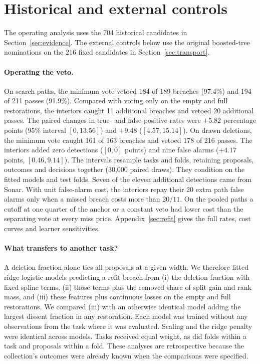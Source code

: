 \section{Historical and external controls}
\label{sec:extended-operating}
The operating analysis uses the 704 historical candidates in Section~\ref{sec:evidence}. The external controls below use the original boosted-tree nominations on the 216 fixed candidates in Section~\ref{sec:transport}.

\paragraph{Operating the veto.}
On search paths, the minimum vote vetoed 184 of 189 breaches (97.4\%) and 194 of 211 passes (91.9\%). Compared with voting only on the empty and full restorations, the interiors caught 11 additional breaches and vetoed 20 additional passes. The paired changes in true- and false-positive rates were $+5.82$ percentage points (95\% interval $[0,13.56]$) and $+9.48$ ($[4.57,15.14]$). On drawn deletions, the minimum vote caught 161 of 163 breaches and vetoed 178 of 216 passes. The interiors added zero detections ($[0,0]$ points) and nine false alarms ($+4.17$ points, $[0.46,9.14]$). The intervals resample tasks and folds, retaining proposals, outcomes and decisions together (30,000 paired draws). They condition on the fitted models and test folds. Seven of the eleven additional detections came from Sonar. With unit false-alarm cost, the interiors repay their 20 extra path false alarms only when a missed breach costs more than $20/11$. On the pooled paths a cutoff at one quarter of the anchor or a constant veto had lower cost than the separating vote at every miss price. Appendix~\ref{sec:refit} gives the full rates, cost curves and learner sensitivities.

\paragraph{What transfers to another task?}
A deletion fraction alone ties all proposals at a given width. We therefore fitted ridge logistic models predicting a refit breach from (i) the deletion fraction with fixed spline terms, (ii) those terms plus the removed share of split gain and rank mass, and (iii) these features plus continuous losses on the empty and full restorations. We compared (iii) with an otherwise identical model adding the largest dissent fraction in any restoration. Each model was trained without any observations from the task where it was evaluated. Scaling and the ridge penalty were identical across models. Tasks received equal weight, as did folds within a task and proposals within a fold. These analyses are retrospective because the collection's outcomes were already known when the comparisons were specified.

